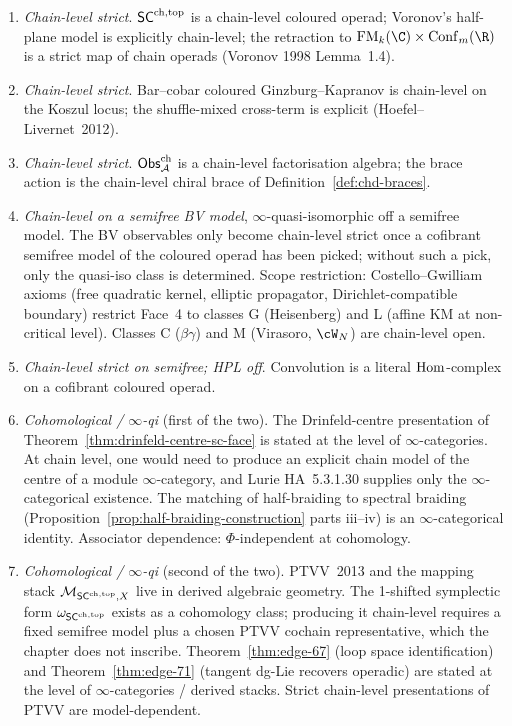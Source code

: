 \begin{enumerate}[label=\textbf{Face~\arabic*:}, leftmargin=*]
\item \emph{Chain-level strict}. $\mathsf{SC}^{\mathrm{ch},\mathrm{top}}$ is a chain-level coloured operad; Voronov's half-plane model is explicitly chain-level; the retraction to $\FM_k(\C) \times \Conf_m(\R)$ is a strict map of chain operads (Voronov 1998 Lemma~1.4).
\item \emph{Chain-level strict}. Bar--cobar coloured Ginzburg--Kapranov is chain-level on the Koszul locus; the shuffle-mixed cross-term is explicit (Hoefel--Livernet~2012).
\item \emph{Chain-level strict}. $\mathsf{Obs}^{\mathrm{ch}}_{\mathcal{A}}$ is a chain-level factorisation algebra; the brace action is the chain-level chiral brace of Definition~\ref*{def:chd-braces}.
\item \emph{Chain-level on a semifree BV model}, $\infty$-quasi-isomorphic off a semifree model. The BV observables only become chain-level strict once a cofibrant semifree model of the coloured operad has been picked; without such a pick, only the quasi-iso class is determined. Scope restriction: Costello--Gwilliam axioms (free quadratic kernel, elliptic propagator, Dirichlet-compatible boundary) restrict Face~4 to classes G (Heisenberg) and L (affine KM at non-critical level). Classes C ($\beta\gamma$) and M (Virasoro, $\cW_N$) are chain-level open.
\item \emph{Chain-level strict on semifree; HPL off}. Convolution is a literal $\mathrm{Hom}$-complex on a cofibrant coloured operad.
\item \emph{Cohomological / $\infty$-qi} (first of the two). The Drinfeld-centre presentation of Theorem~\ref*{thm:drinfeld-centre-sc-face} is stated at the level of $\infty$-categories. At chain level, one would need to produce an explicit chain model of the centre of a module $\infty$-category, and Lurie HA~5.3.1.30 supplies only the $\infty$-categorical existence. The matching of half-braiding to spectral braiding (Proposition~\ref*{prop:half-braiding-construction} parts iii--iv) is an $\infty$-categorical identity. Associator dependence: $\Phi$-independent at cohomology.
\item \emph{Cohomological / $\infty$-qi} (second of the two). PTVV~2013 and the mapping stack $\mathcal{M}_{\mathsf{SC}^{\mathrm{ch},\mathrm{top}}, X}$ live in derived algebraic geometry. The 1-shifted symplectic form $\omega_{\mathsf{SC}^{\mathrm{ch},\mathrm{top}}}$ exists as a cohomology class; producing it chain-level requires a fixed semifree model plus a chosen PTVV cochain representative, which the chapter does not inscribe. Theorem~\ref*{thm:edge-67} (loop space identification) and Theorem~\ref*{thm:edge-71} (tangent dg-Lie recovers operadic) are stated at the level of $\infty$-categories / derived stacks. Strict chain-level presentations of PTVV are model-dependent.
\end{enumerate}

